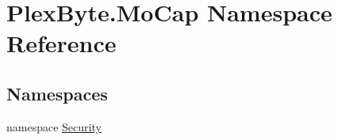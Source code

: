\hypertarget{namespace_plex_byte_1_1_mo_cap}{}\section{Plex\+Byte.\+Mo\+Cap Namespace Reference}
\label{namespace_plex_byte_1_1_mo_cap}
\subsection*{Namespaces}
\begin{DoxyCompactItemize}
\item 
namespace \hyperlink{namespace_plex_byte_1_1_mo_cap_1_1_security}{Security}
\end{DoxyCompactItemize}

